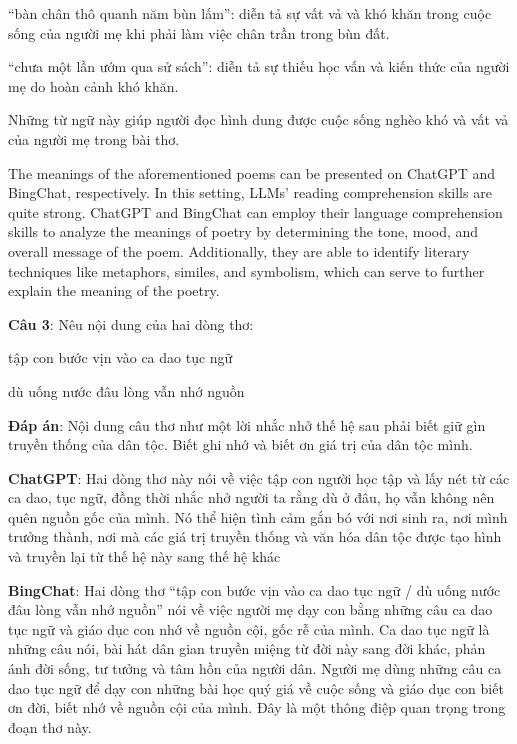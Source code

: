 \documentclass{article}
\begin{document}
{\begin{mdframed}[linewidth=1pt,linecolor=red]
		“bàn chân thô quanh năm bùn lấm”: diễn tả sự vất vả và khó khăn trong cuộc sống của người mẹ khi phải làm việc chân trần trong bùn đất.
		
		“chưa một lần ướm qua sử sách”: diễn tả sự thiếu học vấn và kiến thức của người mẹ do hoàn cảnh khó khăn.
		
		Những từ ngữ này giúp người đọc hình dung được cuộc sống nghèo khó và vất vả của người mẹ trong bài thơ.
		
	\end{mdframed}	
	
	The meanings of the aforementioned poems can be presented on ChatGPT and BingChat, respectively. In this setting, LLMs' reading comprehension skills are quite strong. ChatGPT and BingChat can employ their language comprehension skills to analyze the meanings of poetry by determining the tone, mood, and overall message of the poem. Additionally, they are able to identify literary techniques like metaphors, similes, and symbolism, which can serve to further explain the meaning of the poetry.
	
	
	
	\begin{mdframed}[linewidth=1pt,linecolor=red] 	
\textbf{Câu 3}: Nêu nội dung của hai dòng thơ:


		
		tập con bước vịn vào ca dao tục ngữ 
		
		dù uống nước đâu lòng vẫn nhớ nguồn 
		
		
		\textbf{Đáp án}: Nội dung câu thơ như một lời nhắc nhở thế hệ sau phải biết giữ gìn truyền thống của dân tộc. Biết ghi nhớ và biết ơn giá trị của dân tộc mình.
		
		\textbf{ChatGPT}: Hai dòng thơ này nói về việc tập con người học tập và lấy nét từ các ca dao, tục ngữ, đồng thời nhắc nhở người ta rằng dù ở đâu, họ vẫn không nên quên nguồn gốc của mình. Nó thể hiện tình cảm gắn bó với nơi sinh ra, nơi mình trưởng thành, nơi mà các giá trị truyền thống và văn hóa dân tộc được tạo hình và truyền lại từ thế hệ này sang thế hệ khác
		
		\textbf{BingChat}: Hai dòng thơ “tập con bước vịn vào ca dao tục ngữ / dù uống nước đâu lòng vẫn nhớ nguồn” nói về việc người mẹ dạy con bằng những câu ca dao tục ngữ và giáo dục con nhớ về nguồn cội, gốc rễ của mình. Ca dao tục ngữ là những câu nói, bài hát dân gian truyền miệng từ đời này sang đời khác, phản ánh đời sống, tư tưởng và tâm hồn của người dân. Người mẹ dùng những câu ca dao tục ngữ để dạy con những bài học quý giá về cuộc sống và giáo dục con biết ơn đời, biết nhớ về nguồn cội của mình. Đây là một thông điệp quan trọng trong đoạn thơ này.
		

\end{mdframed}}
\end{document}
